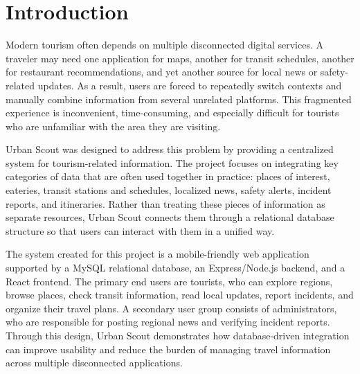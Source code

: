 \section{Introduction}

Modern tourism often depends on multiple disconnected digital services. A traveler may need one application for maps, another for transit schedules, another for restaurant recommendations, and yet another source for local news or safety-related updates. As a result, users are forced to repeatedly switch contexts and manually combine information from several unrelated platforms. This fragmented experience is inconvenient, time-consuming, and especially difficult for tourists who are unfamiliar with the area they are visiting.

Urban Scout was designed to address this problem by providing a centralized system for tourism-related information. The project focuses on integrating key categories of data that are often used together in practice: places of interest, eateries, transit stations and schedules, localized news, safety alerts, incident reports, and itineraries. Rather than treating these pieces of information as separate resources, Urban Scout connects them through a relational database structure so that users can interact with them in a unified way.

The system created for this project is a mobile-friendly web application supported by a MySQL relational database, an Express/Node.js backend, and a React frontend. The primary end users are tourists, who can explore regions, browse places, check transit information, read local updates, report incidents, and organize their travel plans. A secondary user group consists of administrators, who are responsible for posting regional news and verifying incident reports. Through this design, Urban Scout demonstrates how database-driven integration can improve usability and reduce the burden of managing travel information across multiple disconnected applications.
